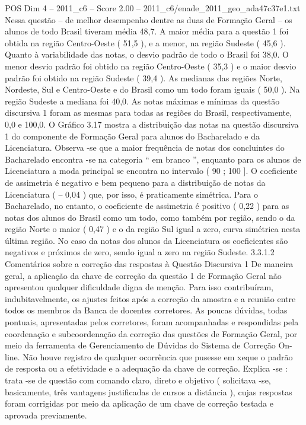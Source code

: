 \begin{textsample}{POS Dim 4 – 2011\_c6 – Score 2.00 – 2011\_c6/enade\_2011\_geo\_ada47c37e1.txt}
Nessa questão – de melhor desempenho dentre as duas de Formação Geral – os alunos de todo Brasil tiveram média 48,7.
A maior média para a questão 1 foi obtida na região Centro-Oeste ( 51,5 ), e a menor, na região Sudeste ( 45,6 ).
Quanto à variabilidade das notas, o desvio padrão de todo o Brasil foi 38,0.
O menor desvio padrão foi obtido na região Centro-Oeste ( 35,3 ) e o maior desvio padrão foi obtido na região Sudeste ( 39,4 ).
As medianas das regiões Norte, Nordeste, Sul e Centro-Oeste e do Brasil como um todo foram iguais ( 50,0 ).
Na região Sudeste a mediana foi 40,0.
As notas máximas e mínimas da questão discursiva 1 foram as mesmas para todas as regiões do Brasil, respectivamente, 0,0 e 100,0.
O Gráfico 3.17 mostra a distribuição das notas na questão discursiva 1 do componente de Formação Geral para alunos do Bacharelado e da Licenciatura.
Observa -se que a maior frequência de notas dos concluintes do Bacharelado encontra -se na categoria “ em branco ”, enquanto para os alunos de Licenciatura a moda principal se encontra no intervalo ( 90 ; 100 ].
O coeficiente de assimetria é negativo e bem pequeno para a distribuição de notas da Licenciatura ( – 0,04 ) que, por isso, é praticamente simétrica.
Para o Bacharelado, no entanto, o coeficiente de assimetria é positivo ( 0,22 ) para as notas dos alunos do Brasil como um todo, como também por região, sendo o da região Norte o maior ( 0,47 ) e o da região Sul igual a zero, curva simétrica nesta última região.
No caso da notas dos alunos da Licenciatura os coeficientes são negativos e próximos de zero, sendo igual a zero na região Sudeste. 3.3.1.2 Comentários sobre a correção das respostas à Questão Discursiva 1 De maneira geral, a aplicação da chave de correção da questão 1 de Formação Geral não apresentou qualquer dificuldade digna de menção.
Para isso contribuíram, indubitavelmente, os ajustes feitos após a correção da amostra e a reunião entre todos os membros da Banca de docentes corretores.
As poucas dúvidas, todas pontuais, apresentadas pelos corretores, foram acompanhadas e respondidas pela coordenação e subcoordenação da correção das questões de Formação Geral, por meio da ferramenta de Gerenciamento de Dúvidas do Sistema de Correção On-line.
Não houve registro de qualquer ocorrência que pusesse em xeque o padrão de resposta ou a efetividade e a adequação da chave de correção.
Explica -se : trata -se de questão com comando claro, direto e objetivo ( solicitava -se, basicamente, três vantagens justificadas de cursos a distância ), cujas respostas foram corrigidas por meio da aplicação de um chave de correção testada e aprovada previamente.

\end{textsample}
